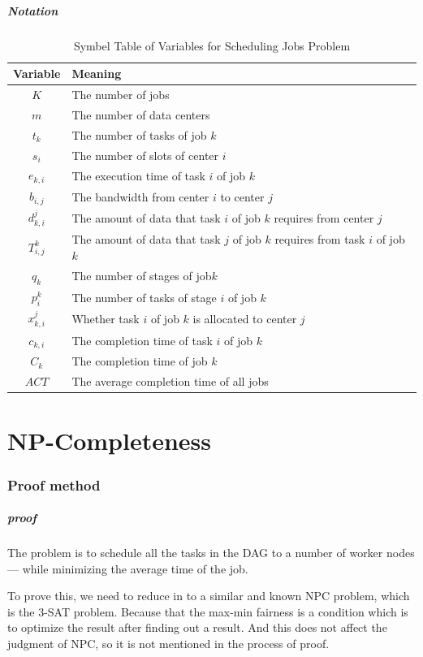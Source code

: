 \documentclass[aspectratio=169]{beamer}
\begin{document}
\begin{frame}
\frametitle{Notation}
\begin{table}[h]
    \centering\scriptsize
    \caption{Symbel Table of Variables for Scheduling Jobs Problem}\label{tab:variables}
    \begin{tabular}{c|l}
    \hline
         Variable & Meaning\\
    \hline
        $K$ & The number of jobs\\
        $m$ & The number of data centers\\
        $t_k$ & The number of tasks of job $k$\\
        $s_i$ & The number of slots of center $i$\\
        $e_{k,i}$ & The execution time of task $i$ of job $k$\\
        $b_{i,j}$ & The bandwidth from center $i$ to center $j$\\
        $d_{k,i}^j$ & The amount of data that task $i$ of job $k$ requires from center $j$\\
        $T_{i,j}^k$ & The amount of data that task $j$ of job $k$ requires from task $i$ of job $k$\\
        $q_k$ & The number of stages of job$k$\\
        $p_i^k$ & The number of tasks of stage $i$ of job $k$\\
        $x_{k,i}^j$ & Whether task $i$ of job $k$ is allocated to center $j$\\
        $c_{k,i}$ & The completion time of task $i$ of job $k$\\
        $C_k$ & The completion time of job $k$\\
        $ACT$ & The average completion time of all jobs\\
    \hline
    \end{tabular}
\end{table}
\end{frame}

\begin{frame}
    
\end{frame}


\part{NP-Completeness}
\section{Proof method}
\begin{frame}[allowframebreaks=0.8]
\frametitle{proof}
    The problem is to schedule all the tasks in the DAG to a number of worker nodes --- while minimizing the average time of the job.
    
    To prove this, we need to reduce in to a similar and known NPC problem, which is the 3-SAT problem. Because that the max-min fairness is a condition which is to optimize the result after finding out a result. And this does not affect the judgment of NPC, so it is not mentioned in the process of proof.
\end{frame}
\end{document}
